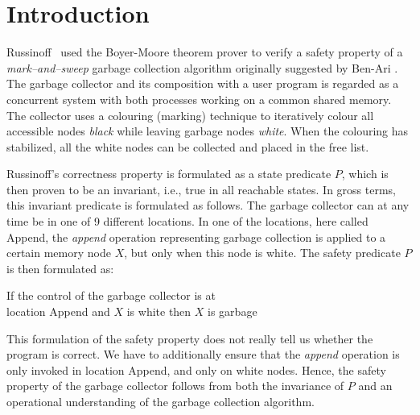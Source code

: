          
\section{Introduction}

Russinoff~\cite{Rus:GC} used   the Boyer-Moore theorem prover  to
verify  a  safety  property   of   a {\em  mark--and--sweep}   garbage
collection  algorithm originally suggested  by Ben-Ari \cite{Ben:GC}. 
The garbage collector and   its composition with   a user  program  is
regarded as a concurrent system with both processes working on
a common shared memory.  The  collector uses a colouring  (marking) technique
to iteratively colour all accessible nodes {\em black} while 
leaving garbage nodes {\em white}.  When the colouring has
stabilized, all the white nodes can be collected and placed in the
free list.

Russinoff's correctness property is formulated as a  state predicate $P$, which
is then proven to be an invariant, i.e., true in all reachable  states.
In gross  terms, 
this invariant predicate is formulated as  follows.  The garbage collector
can at 
any time be in one of 9 different locations.  In one of the locations,
here  called {\sc  Append},  the {\em append} operation  representing
garbage collection is applied to a certain  memory node $X$, but only
when this node is white. The safety  predicate  $P$  is  then formulated  as:

\begin{center}
  If the control of the garbage collector is at\\ location {\sc Append} and
  $X$ is white then $X$ is garbage 
\end{center}

\noindent
This formulation of   the  safety property does not really  tell us
whether the  program is correct.  We 
have to additionally ensure that  the {\em append} operation is
only invoked in location {\sc Append}, and only on white nodes.  Hence,
the safety property of the garbage collector follows from both the
invariance of $P$ and an operational understanding of the
garbage collection algorithm.  

